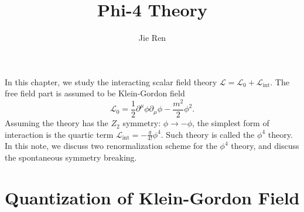 \documentclass[aps,prb,superscriptaddress,nofootinbib]{revtex4}
\begin{document}
\title{Phi-4 Theory}
\author{Jie Ren}


\maketitle



In this chapter, we study the interacting scalar field theory $\mathcal L = \mathcal L_0 + \mathcal L_{\mathrm{int}}$.
The free field part is assumed to be Klein-Gordon field 
\begin{equation}
	\mathcal L_0 =\frac{1}{2}\partial^\mu \phi \partial_\mu \phi -\frac{m^2}{2}\phi^2.
\end{equation}
Assuming the theory has the $Z_2$ symmetry: $\phi \rightarrow -\phi$, the simplest form of interaction is the quartic term $\mathcal L_{\mathrm{int}} = -\frac{g}{4!}\phi^4$.
Such theory is called the $\phi^4$ theory.
In this note, we discuss two renormalization scheme for the $\phi^4$ theory, and discuss the spontaneous symmetry breaking.


\tableofcontents

\section{Quantization of Klein-Gordon Field}
\end{document}
